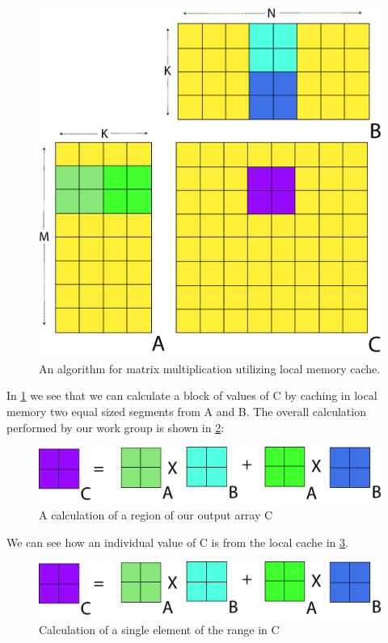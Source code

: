 \documentclass[conc-doc]{subfiles}
\begin{document}
\begin{figure}[H]
	\centerline{\includegraphics[width=\textwidth]{images/gpu-matmult2.png}}
	\caption{An algorithm for matrix multiplication utilizing local memory cache.}
	\label{fig:matmult2}
\end{figure}

In \ref{fig:matmult2} we see that we can calculate a block of values of C by caching in local memory two equal sized segments from A and B. The overall calculation performed by our work group is shown in \ref{fig:matmult3}:

\begin{figure}[H]
	\centerline{\includegraphics[width=\textwidth]{images/gpu-matmult3.png}}
	\caption{A calculation of a region of our output array C}
	\label{fig:matmult3}
\end{figure}

We can see how an individual value of C is from the local cache in \ref{fig:matmult4}.

\begin{figure}[H]
	\centerline{\includegraphics[width=\textwidth]{images/gpu-matmult3.png}}
	\caption{Calculation of a single element of the range in C}
	\label{fig:matmult4}
\end{figure}
\end{document}
